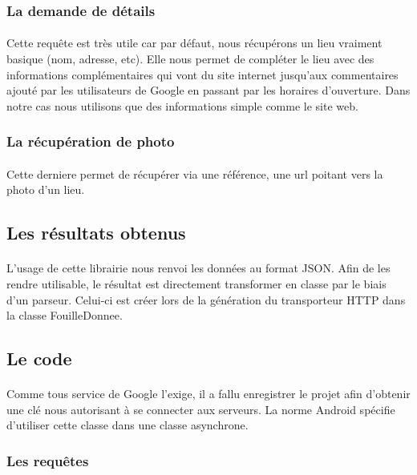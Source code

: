 \subsubsection*{La demande de détails}
\paragraph{}
Cette requête est très utile car par défaut, nous récupérons un lieu vraiment basique (nom, adresse, etc). Elle nous permet de compléter le lieu avec des informations complémentaires qui vont du site internet jusqu'aux commentaires ajouté par les utilisateurs de Google en passant par les horaires d'ouverture.
Dans notre cas nous utilisons que des informations simple comme le site web.

\subsubsection*{La récupération de photo}
\paragraph{}
Cette derniere permet de récupérer via une référence, une url poitant vers la photo d'un lieu.

\subsection*{Les résultats obtenus}
\paragraph{}
L'usage de cette librairie nous renvoi les données au format JSON. Afin de les rendre utilisable, le résultat est directement transformer en classe par le biais d'un parseur. Celui-ci est créer lors de la génération du transporteur HTTP dans la classe FouilleDonnee.

\subsection*{Le code}
\paragraph{}
Comme tous service de Google l'exige, il a fallu enregistrer le projet afin d'obtenir une clé nous autorisant à se connecter aux serveurs. La norme Android spécifie d'utiliser cette classe dans une classe asynchrone.
\clearpage
\subsubsection*{Les requêtes}
